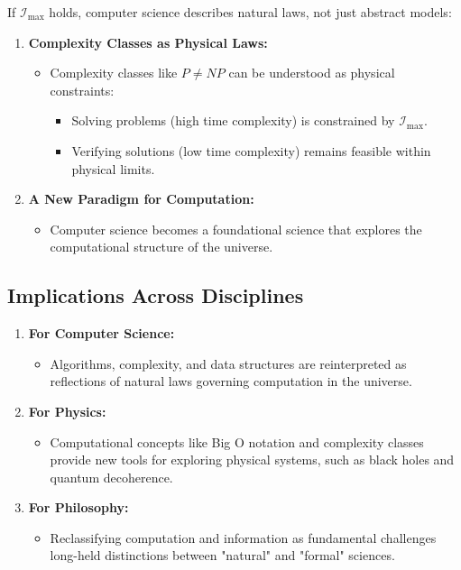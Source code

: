 \documentclass[12pt]{article}
\begin{document}
If $\mathcal{I}_{\text{max}}$ holds, computer science describes natural laws, not just abstract models:
\begin{enumerate}
    \item \textbf{Complexity Classes as Physical Laws:}
    \begin{itemize}
        \item Complexity classes like $P \neq NP$ can be understood as physical constraints:
        \begin{itemize}
            \item Solving problems (high time complexity) is constrained by $\mathcal{I}_{\text{max}}$.
            \item Verifying solutions (low time complexity) remains feasible within physical limits.
        \end{itemize}
    \end{itemize}

    \item \textbf{A New Paradigm for Computation:}
    \begin{itemize}
        \item Computer science becomes a foundational science that explores the computational structure of the universe.
    \end{itemize}
\end{enumerate}

\subsection{Implications Across Disciplines}

\begin{enumerate}
    \item \textbf{For Computer Science:}
    \begin{itemize}
        \item Algorithms, complexity, and data structures are reinterpreted as reflections of natural laws governing computation in the universe.
    \end{itemize}

    \item \textbf{For Physics:}
    \begin{itemize}
        \item Computational concepts like Big O notation and complexity classes provide new tools for exploring physical systems, such as black holes and quantum decoherence.
    \end{itemize}

    \item \textbf{For Philosophy:}
    \begin{itemize}
        \item Reclassifying computation and information as fundamental challenges long-held distinctions between "natural" and "formal" sciences.
    \end{itemize}
\end{enumerate}
\end{document}
